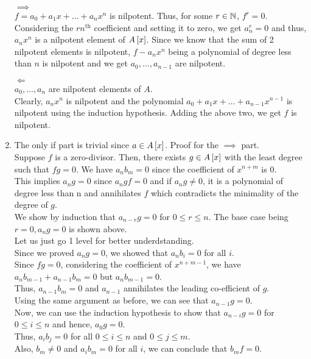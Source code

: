 \begin{enumerate}
	\( \implies \) \\
	\( f = a_0 + a_1 x + \ldots + a_n x^n \) is nilpotent.
	Thus, for some \( r \in \NN \), \( f^r = 0 \).
	Considering the \( rn^{\text{th}} \) coefficient and setting it to zero,
	we get \( a_n^r = 0 \) and thus, \( a_n x^n \) is a nilpotent
	element of \( A\left[ x \right] \).
	Since we know that the sum of 2 nilpotent elements is nilpotent,
	\( f - a_n x^n \) being a polynomial of degree less than \( n \)
	is nilpotent and we get \( a_0, \ldots, a_{n-1} \) are nilpotent.

	\( \Longleftarrow \) \\
	\( a_0, \ldots, a_n \) are nilpotent elements of \( A \). \\
	Clearly, \( a_n x^n \) is nilpotent and the polynomial
	\( a_0 + a_1 x + \ldots + a_{n-1} x^{n-1} \) is nilpotent using
	the induction hypothesis.
	Adding the above two, we get \( f \) is nilpotent.


	\item
	The only if part is trivial since \( a \in A\left[ x \right] \).
	Proof for the \( \implies \) part. \\
	Suppose \( f \) is a zero-divisor.
	Then, there exists \( g \in A\left[ x \right] \) with the least degree
	such that \( fg = 0 \).
	We have \( a_n b_m = 0 \) since the coefficient of \( x^{n+m} \) is 0. \\
	This implies \( a_n g = 0 \) since \( a_n g f = 0 \) and
	if \( a_n g \neq 0 \), it is a polynomial of degree less than n and
	annihilates \( f \) which contradicts the minimality of the degree of
	\( g \). \\

	We show by induction that \( a_{n-r} g = 0 \) for \( 0 \leq r \leq n \).
	The base case being \( r = 0, a_{n} g = 0 \) is shown above. \\
	Let us just go 1 level for better underdstanding. \\
	Since we proved \( a_n g = 0 \), we showed that \( a_n b_i = 0 \)
	for all \( i \). \\
	Since \( f g = 0 \), considering the coefficient of \( x^{n+m-1} \),
	we have \( a_n b_{m-1} + a_{n-1} b_m = 0 \) but \( a_n b_{m-1} = 0 \). \\
	Thus, \( a_{n-1} b_m = 0 \) and \( a_{n-1} \) annihilates the leading
	co-efficient of \( g \). \\
	Using the same argument as before, we can see that \( a_{n-1} g = 0 \). \\

	Now, we can use the induction hypothesis to show that
	\( a_{n-i} g = 0 \) for \( 0 \leq i \leq n \) and hence,
	\( a_0 g = 0 \). \\
	Thus, \( a_i b_j = 0 \) for all \( 0 \leq i \leq n \) and
	\( 0 \leq j \leq m \). \\
	Also, \( b_m \neq 0 \) and \( a_i b_m = 0 \) for all \( i \),
	we can conclude that \( b_m f = 0 \). \\



\end{enumerate}
